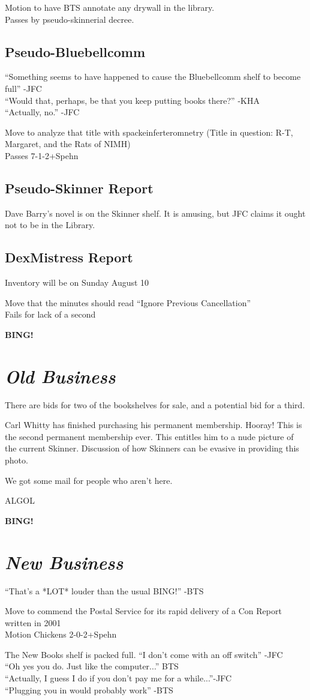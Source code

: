 \documentclass[12pt]{article}
\newcommand{\bing}{{\bf BING!} }
\newcommand{\goto}[1]{\bing \vskip 12pt \section*{{\em{#1}}}}
\begin{document}
Motion to have BTS annotate any drywall in the library.\\
Passes by pseudo-skinnerial decree.

\subsection*{Pseudo-Bluebellcomm}
``Something seems to have happened to cause the Bluebellcomm shelf to
become full'' -JFC\\
``Would that, perhaps, be that you keep putting books there?'' -KHA\\
``Actually, no.'' -JFC

Move to analyze that title with spackeinferteromnetry (Title in
question: R-T, Margaret, and the Rats of NIMH)\\
Passes 7-1-2+Spehn

\subsection*{Pseudo-Skinner Report}
Dave Barry's novel is on the Skinner shelf. It is amusing, but JFC
claims it ought not to be in the Library.

\subsection*{DexMistress Report}
Inventory will be on Sunday August 10

Move that the minutes should read ``Ignore Previous Cancellation''\\
Fails for lack of a second

\goto{Old Business}
There are bids for two of the bookshelves for sale, and a potential
bid for a third.

Carl Whitty has finished purchasing his permanent membership. Hooray!
This is the second permanent membership ever.
This entitles him to a nude picture of the current Skinner.
Discussion of how Skinners can be evasive in providing this photo.

We got some mail for people who aren't here.

ALGOL

\goto{New Business}
``That's a *LOT* louder than the usual BING!'' -BTS

Move to commend the Postal Service for its rapid delivery of a Con
Report written in 2001\\
Motion Chickens 2-0-2+Spehn

The New Books shelf is packed full.
``I don't come with an off switch'' -JFC\\
``Oh yes you do. Just like the computer...'' BTS\\
``Actually, I guess I do if you don't pay me for a while...''-JFC \\
``Plugging you in would probably work'' -BTS
\end{document}
